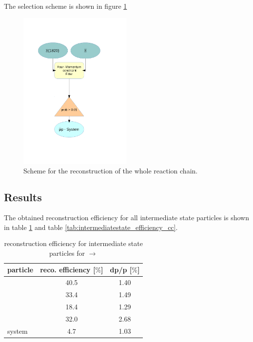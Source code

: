 	The selection scheme is shown in figure \ref{fig:fourconstraintfit}
	 
	\begin{figure}
		\centering
			\includegraphics[width=0.50\textwidth]{./plots/combineCascadeSys.pdf}
		\caption{\propose Scheme for the reconstruction of the whole reaction chain.}
		\label{fig:fourconstraintfit}
	\end{figure}
	
	\subsection*{Results}
	
	The obtained reconstruction efficiency for all intermediate state particles is shown in table \ref{tab:intermediatestate_efficiency}
	and table \ref{tab:intermediatestate_efficiency_cc}.
	
	\begin{table}
		\centering
		\caption{\propose reconstruction efficiency for intermediate state particles for \pbarp $\rightarrow$ \excitedcascade \anticascade}
		\label{tab:intermediatestate_efficiency}
		
		\begin{tabular}{lcc}
		
			\hline
			particle & reco. efficiency [$\%$] & dp/p [$\%$] \\\hline
			\hline
			\lam & 40.5&   1.40 \\
			\alam & 33.4&   1.49\\
			\anticascade & 18.4&   1.29\\
			\excitedcascade & 32.0&   2.68 \\
			\excitedcascade \anticascade system & 4.7&   1.03\\\hline
			 	
		\end{tabular}
	\end{table}
	

